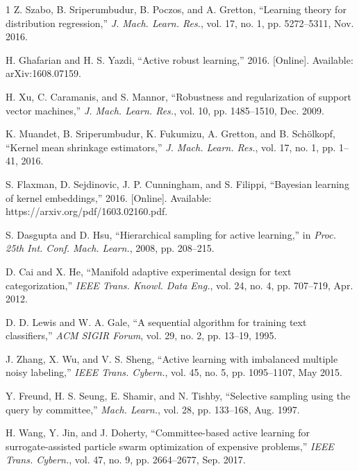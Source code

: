 \documentclass[10pt,twocolumn]{IEEEtran}
\begin{document}
\begin{thebibliography}{1}
		Z. Szabo, B. Sriperumbudur, B. Poczos, and A. Gretton, ``Learning theory for distribution regression,'' \emph{J. Mach. Learn. Res.}, vol. 17, no. 1, pp. 5272--5311, Nov. 2016.
		
		H. Ghafarian and H. S. Yazdi, ``Active robust learning,'' 2016. [Online]. Available: arXiv:1608.07159.
		
		H. Xu, C. Caramanis, and S. Mannor, ``Robustness and regularization of support vector machines,'' \emph{J. Mach. Learn. Res.}, vol. 10, pp. 1485--1510, Dec. 2009.
		
		K. Muandet, B. Sriperumbudur, K. Fukumizu, A. Gretton, and B. Schölkopf, ``Kernel mean shrinkage estimators,'' \emph{J. Mach. Learn. Res.}, vol. 17, no. 1, pp. 1--41, 2016.
		
		S. Flaxman, D. Sejdinovic, J. P. Cunningham, and S. Filippi, ``Bayesian learning of kernel embeddings,'' 2016. [Online]. Available: https://arxiv.org/pdf/1603.02160.pdf.
		
		S. Dasgupta and D. Hsu, ``Hierarchical sampling for active learning,'' in \emph{Proc. 25th Int. Conf. Mach. Learn.}, 2008, pp. 208--215.
		
		D. Cai and X. He, ``Manifold adaptive experimental design for text categorization,'' \emph{IEEE Trans. Knowl. Data Eng.}, vol. 24, no. 4, pp. 707--719, Apr. 2012.
		
		D. D. Lewis and W. A. Gale, ``A sequential algorithm for training text classifiers,'' \emph{ACM SIGIR Forum}, vol. 29, no. 2, pp. 13--19, 1995.
		
		J. Zhang, X. Wu, and V. S. Sheng, ``Active learning with imbalanced multiple noisy labeling,'' \emph{IEEE Trans. Cybern.}, vol. 45, no. 5, pp. 1095--1107, May 2015.
		
		Y. Freund, H. S. Seung, E. Shamir, and N. Tishby, ``Selective sampling using the query by committee,'' \emph{Mach. Learn.}, vol. 28, pp. 133--168, Aug. 1997.
		
		H. Wang, Y. Jin, and J. Doherty, ``Committee-based active learning for surrogate-assisted particle swarm optimization of expensive problems,'' \emph{IEEE Trans. Cybern.}, vol. 47, no. 9, pp. 2664--2677, Sep. 2017.
		

\end{thebibliography}
\end{document}
